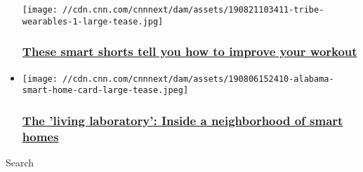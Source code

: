 \begin{itemize}
  \texttt{[image: //cdn.cnn.com/cnnnext/dam/assets/190821103411-tribe-wearables-1-large-tease.jpg]}

  \hypertarget{these-smart-shorts-tell-you-how-to-improve-your-workout}{%
  \subsubsection{\texorpdfstring{\href{/2019/08/23/business/tribe-wearable-tech/index.html}{These
  smart shorts tell you how to improve your
  workout}}{These smart shorts tell you how to improve your workout}}\label{these-smart-shorts-tell-you-how-to-improve-your-workout}}
\item
  \href{/2019/08/07/business/alabama-power-smart-neighborhood/index.html}{}

  \texttt{[image: //cdn.cnn.com/cnnnext/dam/assets/190806152410-alabama-smart-home-card-large-tease.jpeg]}

  \hypertarget{the-living-laboratory-inside-a-neighborhood-of-smart-homes}{%
  \subsubsection{\texorpdfstring{\href{/2019/08/07/business/alabama-power-smart-neighborhood/index.html}{The
  'living laboratory': Inside a neighborhood of smart
  homes}}{The 'living laboratory': Inside a neighborhood of smart homes}}\label{the-living-laboratory-inside-a-neighborhood-of-smart-homes}}
\end{itemize}

Search

